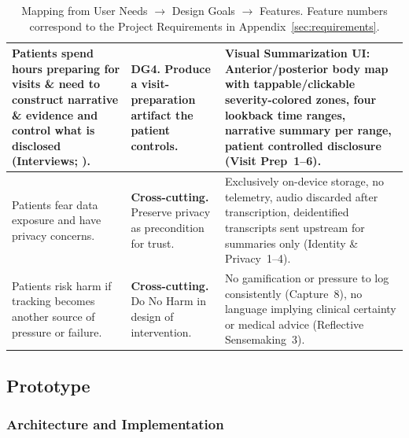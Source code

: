 \begin{table}[H]
\begin{tabular}{p{}|p{}:p{0.33\textwidth}}
    \hline
    Patients spend hours preparing for visits \& need to construct narrative \& evidence and control what is disclosed (Interviews; \cite{Pichon2021Divided}).           & \textbf{DG4.} Produce a visit-preparation artifact the patient controls.                    & \textbf{Visual Summarization UI:} Anterior/posterior body map with tappable/clickable severity-colored zones, four lookback time ranges, narrative summary per range, patient controlled disclosure \textcolor{phendopink}{(Visit Prep~1--6)}.                                                                                                   \\
    \hline
    Patients fear data exposure and have privacy concerns.                                                                                                               & \textbf{Cross-cutting.} Preserve privacy as precondition for trust.                         & Exclusively on-device storage, no telemetry, audio discarded after transcription, deidentified transcripts sent upstream for summaries only \textcolor{phendopink}{(Identity \& Privacy~1--4)}.                                                                                                                                                  \\
    \hline
    Patients risk harm if tracking becomes another source of pressure or failure\cite{McKillop2019Thesis}.                                                               & \textbf{Cross-cutting.} Do No Harm in design of intervention.                               & No gamification or pressure to log consistently \textcolor{phendopink}{(Capture~8)}, no language implying clinical certainty or medical advice \textcolor{phendopink}{(Reflective Sensemaking~3)}.                                                                                                                                               \\
    \hline
  \end{tabular}
  \caption{Mapping from User Needs $\rightarrow$ Design Goals $\rightarrow$ Features. \textcolor{phendopink}{Feature numbers} correspond to the Project Requirements in Appendix~\ref{sec:requirements}.}
  \label{tab:needs-goals-features}
\end{table}

\subsection{Prototype}

\subsubsection{Architecture and Implementation}

